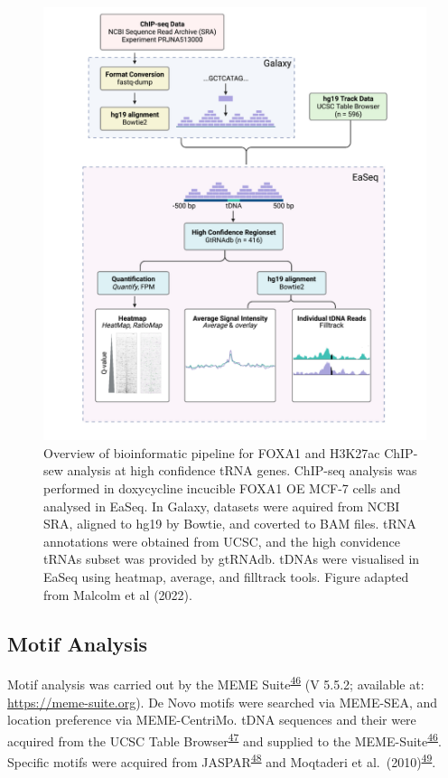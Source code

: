 \documentclass[
  12pt,
]{article}
\begin{document}
\begin{figure}[p]
\includegraphics[width=1\linewidth]{../images/methods} \caption{Overview of bioinformatic pipeline for FOXA1 and H3K27ac ChIP-sew analysis at high confidence tRNA genes. ChIP-seq analysis was performed in doxycycline incucible FOXA1 OE MCF-7 cells and analysed in EaSeq. In Galaxy, datasets were aquired from NCBI SRA, aligned to hg19 by Bowtie, and coverted to BAM files. tRNA annotations were obtained from UCSC, and the high convidence tRNAs subset was provided by gtRNAdb. tDNAs were visualised in EaSeq using heatmap, average, and filltrack tools. Figure adapted from Malcolm et al (2022).}\label{fig:methods}
\end{figure}

\hypertarget{motif-analysis}{%
\subsection{Motif Analysis}\label{motif-analysis}}

Motif analysis was carried out by the MEME Suite\textsuperscript{\protect\hyperlink{ref-Bailey2015}{46}} (V 5.5.2; available at: \href{https://meme-suite.org/}{https://meme-suite.org}).
De Novo motifs were searched via MEME-SEA, and location preference via MEME-CentriMo.
tDNA sequences and their were acquired from the UCSC Table Browser\textsuperscript{\protect\hyperlink{ref-Navarro2021}{47}} and supplied to the MEME-Suite\textsuperscript{\protect\hyperlink{ref-Bailey2015}{46}}.
Specific motifs were acquired from JASPAR\textsuperscript{\protect\hyperlink{ref-Castro-Mondragon2022}{48}} and Moqtaderi et al.~(2010)\textsuperscript{\protect\hyperlink{ref-Moqtaderi2010}{49}}.
\end{document}

